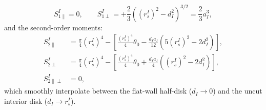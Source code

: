 \documentclass[preprint,12pt]{elsarticle}
\begin{document}
\begin{enumerate}
          \begin{equation}
              S_{1\parallel}^I = 0, \qquad S_{1\perp}^I = +\frac{2}{3} \left((r_s^I)^2 - d_I^2\right)^{3/2} = \frac{2}{3} a_I^3,
          \end{equation}
          and the second-order moments:
          \begin{align}
              S_{2\parallel}^I      & = \frac{\pi}{4}(r_s^I)^4 - \left[ \frac{(r_s^I)^4}{4}\theta_0 - \frac{d_I a_I}{12}\left(5(r_s^I)^2 - 2d_I^2\right) \right], \\
              S_{2\perp}^I          & = \frac{\pi}{4}(r_s^I)^4 - \left[ \frac{(r_s^I)^4}{4}\theta_0 + \frac{d_I a_I}{4}\left((r_s^I)^2 - 2d_I^2\right) \right],  \\
              S_{2\parallel\perp}^I & = 0,
          \end{align}
          which smoothly interpolate between the flat-wall half-disk ($d_I \to 0$) and the uncut interior disk ($d_I \to r_s^I$).
\end{enumerate}



\end{document}
